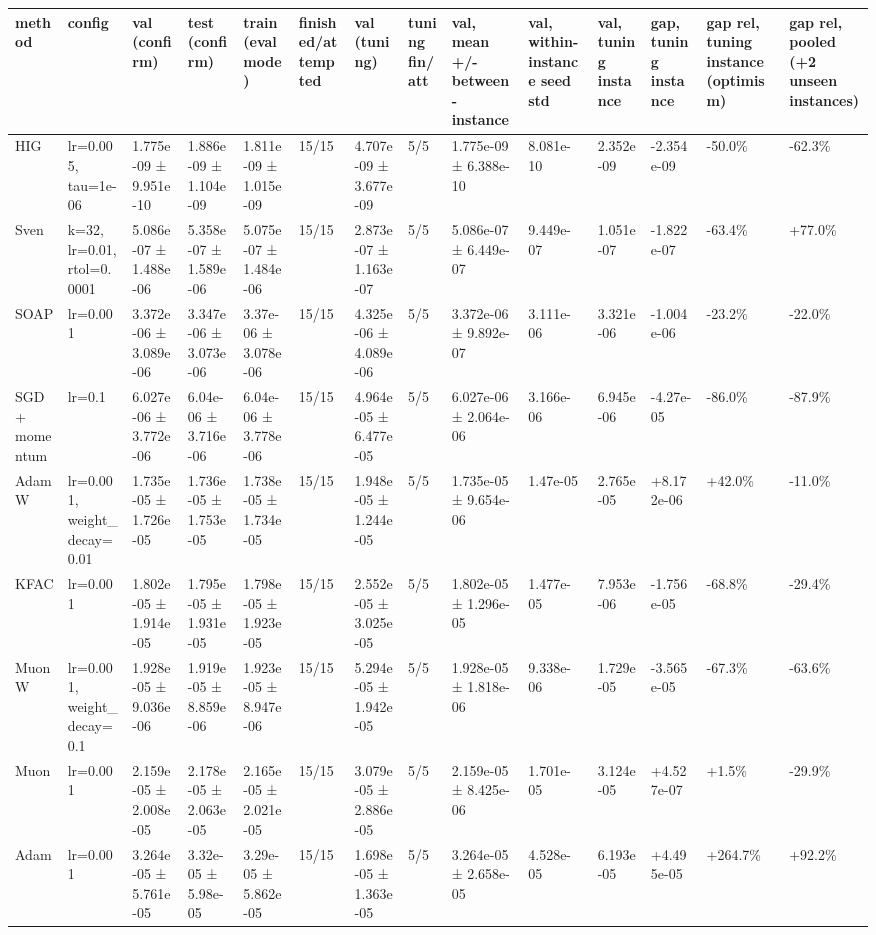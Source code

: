 \begin{tabular}{llllllllllllll}
\toprule
method & config & val (confirm) & test (confirm) & train (eval mode) & finished/attempted & val (tuning) & tuning fin/att & val, mean +/- between-instance & val, within-instance seed std & val, tuning instance & gap, tuning instance & gap rel, tuning instance (optimism) & gap rel, pooled (+2 unseen instances) \\
\midrule
HIG & lr=0.005, tau=1e-06 & 1.775e-09 ± 9.951e-10 & 1.886e-09 ± 1.104e-09 & 1.811e-09 ± 1.015e-09 & 15/15 & 4.707e-09 ± 3.677e-09 & 5/5 & 1.775e-09 ± 6.388e-10 & 8.081e-10 & 2.352e-09 & -2.354e-09 & -50.0\% & -62.3\% \\
Sven & k=32, lr=0.01, rtol=0.0001 & 5.086e-07 ± 1.488e-06 & 5.358e-07 ± 1.589e-06 & 5.075e-07 ± 1.484e-06 & 15/15 & 2.873e-07 ± 1.163e-07 & 5/5 & 5.086e-07 ± 6.449e-07 & 9.449e-07 & 1.051e-07 & -1.822e-07 & -63.4\% & +77.0\% \\
SOAP & lr=0.001 & 3.372e-06 ± 3.089e-06 & 3.347e-06 ± 3.073e-06 & 3.37e-06 ± 3.078e-06 & 15/15 & 4.325e-06 ± 4.089e-06 & 5/5 & 3.372e-06 ± 9.892e-07 & 3.111e-06 & 3.321e-06 & -1.004e-06 & -23.2\% & -22.0\% \\
SGD + momentum & lr=0.1 & 6.027e-06 ± 3.772e-06 & 6.04e-06 ± 3.716e-06 & 6.04e-06 ± 3.778e-06 & 15/15 & 4.964e-05 ± 6.477e-05 & 5/5 & 6.027e-06 ± 2.064e-06 & 3.166e-06 & 6.945e-06 & -4.27e-05 & -86.0\% & -87.9\% \\
AdamW & lr=0.001, weight\_decay=0.01 & 1.735e-05 ± 1.726e-05 & 1.736e-05 ± 1.753e-05 & 1.738e-05 ± 1.734e-05 & 15/15 & 1.948e-05 ± 1.244e-05 & 5/5 & 1.735e-05 ± 9.654e-06 & 1.47e-05 & 2.765e-05 & +8.172e-06 & +42.0\% & -11.0\% \\
KFAC & lr=0.001 & 1.802e-05 ± 1.914e-05 & 1.795e-05 ± 1.931e-05 & 1.798e-05 ± 1.923e-05 & 15/15 & 2.552e-05 ± 3.025e-05 & 5/5 & 1.802e-05 ± 1.296e-05 & 1.477e-05 & 7.953e-06 & -1.756e-05 & -68.8\% & -29.4\% \\
MuonW & lr=0.001, weight\_decay=0.1 & 1.928e-05 ± 9.036e-06 & 1.919e-05 ± 8.859e-06 & 1.923e-05 ± 8.947e-06 & 15/15 & 5.294e-05 ± 1.942e-05 & 5/5 & 1.928e-05 ± 1.818e-06 & 9.338e-06 & 1.729e-05 & -3.565e-05 & -67.3\% & -63.6\% \\
Muon & lr=0.001 & 2.159e-05 ± 2.008e-05 & 2.178e-05 ± 2.063e-05 & 2.165e-05 ± 2.021e-05 & 15/15 & 3.079e-05 ± 2.886e-05 & 5/5 & 2.159e-05 ± 8.425e-06 & 1.701e-05 & 3.124e-05 & +4.527e-07 & +1.5\% & -29.9\% \\
Adam & lr=0.001 & 3.264e-05 ± 5.761e-05 & 3.32e-05 ± 5.98e-05 & 3.29e-05 ± 5.862e-05 & 15/15 & 1.698e-05 ± 1.363e-05 & 5/5 & 3.264e-05 ± 2.658e-05 & 4.528e-05 & 6.193e-05 & +4.495e-05 & +264.7\% & +92.2\% \\

\end{tabular}
